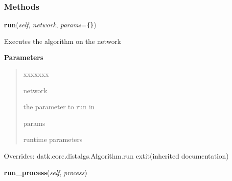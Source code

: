   \subsubsection{Methods}

    \vspace{0.5ex}

\hspace{.8\funcindent}\begin{boxedminipage}{\funcwidth}

    \raggedright \textbf{run}(\textit{self}, \textit{network}, \textit{params}={\tt \texttt{\{}\texttt{\}}})

\setlength{\parskip}{2ex}
    Executes the algorithm on the network

\setlength{\parskip}{1ex}
      \textbf{Parameters}
      \vspace{-1ex}

      \begin{quote}
        \begin{Ventry}{xxxxxxx}

          \item[network]

          the parameter to run in

          \item[params]

          runtime parameters

        \end{Ventry}

      \end{quote}

      Overrides: datk.core.distalgs.Algorithm.run 	extit{(inherited documentation)}

    \end{boxedminipage}

    \label{datk:core:distalgs:Asynchronous_Algorithm:run_process}

    \vspace{0.5ex}

\hspace{.8\funcindent}\begin{boxedminipage}{\funcwidth}

    \raggedright \textbf{run\_process}(\textit{self}, \textit{process})

\setlength{\parskip}{2ex}
\setlength{\parskip}{1ex}
    \end{boxedminipage}


